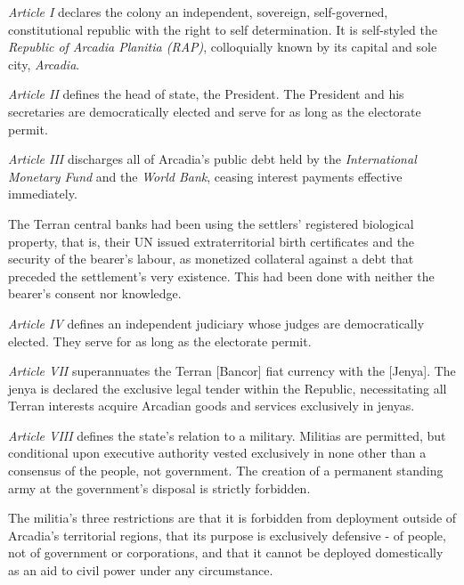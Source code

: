 
\startitemize[5]
\item {\it Article I} declares the colony an independent, sovereign, self-governed, constitutional republic with the right to self determination. It is self-styled the {\it Republic of Arcadia Planitia (RAP)}, colloquially known by its capital and sole city, {\it Arcadia}.

\item {\it Article II} defines the head of state, the President. The President and his secretaries are democratically elected and serve for as long as the electorate permit.

\item {\it Article III} discharges all of Arcadia's public debt held by the {\it International Monetary Fund} and the {\it World Bank}, ceasing interest payments effective immediately. 

The Terran central banks had been using the settlers' registered biological property, that is, their UN issued extraterritorial birth certificates and the security of the bearer's labour, as monetized collateral against a debt that preceded the settlement's very existence. This had been done with neither the bearer's consent nor knowledge.

\item {\it Article IV} defines an independent judiciary whose judges are democratically elected. They serve for as long as the electorate permit.

\item {\it Article VII} superannuates the Terran [Bancor] fiat currency with the [Jenya]. The jenya is declared the exclusive legal tender within the Republic, necessitating all Terran interests acquire Arcadian goods and services exclusively in jenyas.

\item {\it Article VIII} defines the state's relation to a military. Militias are permitted, but conditional upon executive authority vested exclusively in none other than a consensus of the people, not government. The creation of a permanent standing army at the government's disposal is strictly forbidden.

The militia's three restrictions are that it is forbidden from deployment outside of Arcadia's territorial regions, that its purpose is exclusively defensive - of people, not of government or corporations, and that it cannot be deployed domestically as an aid to civil power under any circumstance.

